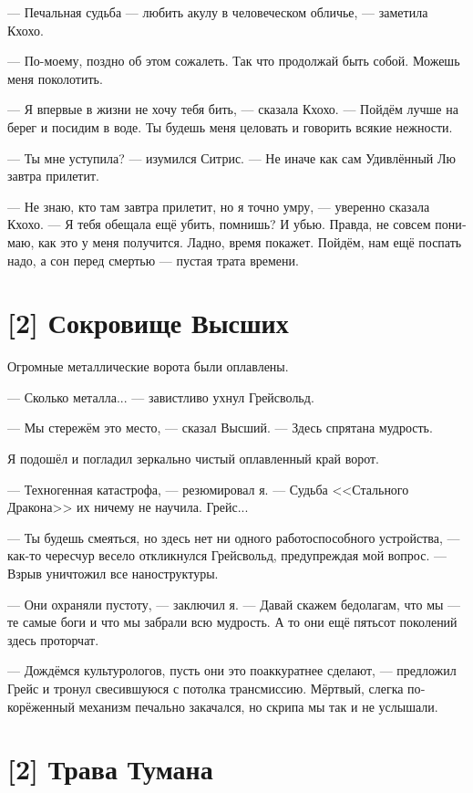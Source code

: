 \documentclass[a4paper,12pt,fleqn]{book}\usepackage{cooltooltips}\usepackage{polyglossia}\setdefaultlanguage[babelshorthands=true]{russian}\setotherlanguage{english}\defaultfontfeatures{Ligatures=TeX,Mapping=tex-text} \usepackage{xcolor}\definecolor{lightgray}{HTML}{bbbbbb}\color{lightgray}\newcommand{\ml}[3]{\textenglish{\textcolor{black}{#3}}}
\begin{document}
{--- Печальная судьба --- любить акулу в человеческом обличье, --- заметила Кхохо.

--- По-моему, поздно об этом сожалеть.
Так что продолжай быть собой.
Можешь меня поколотить.

--- Я впервые в жизни не хочу тебя бить, --- сказала Кхохо.
--- Пойдём лучше на берег и посидим в воде.
Ты будешь меня целовать и говорить всякие нежности.

--- Ты мне уступила? --- изумился Ситрис.
--- Не иначе как сам Удивлённый Лю завтра прилетит.

--- Не знаю, кто там завтра прилетит, но я точно умру, --- уверенно сказала Кхохо.
--- Я тебя обещала ещё убить, помнишь?
И убью.
Правда, не совсем понимаю, как это у меня получится.
Ладно, время покажет.
Пойдём, нам ещё поспать надо, а сон перед смертью --- пустая трата времени.

\section{[2] Сокровище Высших}

Огромные металлические ворота были оплавлены.

--- Сколько металла... --- завистливо ухнул Грейсвольд.

--- Мы стережём это место, --- сказал Высший.
--- Здесь спрятана мудрость.

Я подошёл и погладил зеркально чистый оплавленный край ворот.

--- Техногенная катастрофа, --- резюмировал я.
--- Судьба <<Стального Дракона>> их ничему не научила.
Грейс...

--- Ты будешь смеяться, но здесь нет ни одного работоспособного устройства, --- как-то чересчур весело откликнулся Грейсвольд, предупреждая мой вопрос.
--- Взрыв уничтожил все наноструктуры.

--- Они охраняли пустоту, --- заключил я.
--- Давай скажем бедолагам, что мы --- те самые боги и что мы забрали всю мудрость.
А то они ещё пятьсот поколений здесь проторчат.

--- Дождёмся культурологов, пусть они это поаккуратнее сделают, --- предложил Грейс и тронул свесившуюся с потолка трансмиссию.
Мёртвый, слегка покорёженный механизм печально закачался, но скрипа мы так и не услышали.

\section{[2] Трава Тумана}

}
\end{document}
